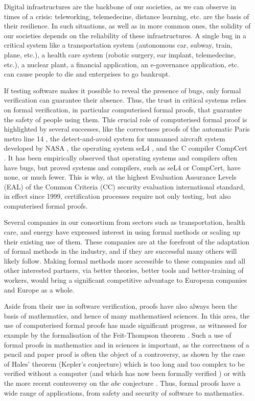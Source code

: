 \thispagestyle{empty}


Digital infrastructures are the backbone of our societies, as we can
observe in times of a crisis: teleworking, telemedecine, distance
learning, etc. are the basis of their resilience.  In such situations,
as well as in more common ones, the solidity of our societies depends
on the reliability of these infrastructures.  A single bug in a
critical system like a transportation system (autonomous car, subway,
train, plane, etc.), a health care system (robotic surgery, ear
implant, telemedecine, etc.), a nuclear plant, a financial
application, an e-governance application, etc.  can cause people to
die and enterprises to go bankrupt.

If testing software makes it possible to reveal the presence of bugs,
only formal verification can guarantee their absence. Thus, the trust
in critical systems relies on formal verification, in particular
computerised formal proofs, that guarantee the safety of people using
them. This crucial role of computerised formal proof is highlighted by
several successes, like the correctness proofs of the automatic Paris
metro line 14 \cite{Behm98,Lecomte17}, the detect-and-avoid system for
unmanned aircraft system developed by NASA \cite{Munoz16}, the
operating system seL4 \cite{Klein09}, and the C compiler CompCert
\cite{Leroy06}.  It has been empirically observed that operating
systems and compilers often have bugs, but proved systems and
compilers, such as seL4 or CompCert, have none, or much fewer.  This
is why, at the highest Evaluation Assurance Levels (EAL) of the Common
Criteria (CC) security evaluation international standard, in effect
since 1999, certification processes require not only testing, but also
computerised formal proofs.

Several companies in our consortium from sectors such as
transportation, health care, and energy have expressed interest in
using formal methods or scaling up their existing use of them. These
companies are at the forefront of the adaptation of formal methods in
the industry, and if they are successful many others will likely
follow. Making formal methods more accessible to these companies
and all other interested partners, via better theories, better tools
and better-training of workers, would bring a significant
competitive advantage to European companies and Europe as a whole.

Aside from their use in software verification, proofs have also always
been the basis of mathematics, and hence of many mathematised
sciences. In this area, the use of computerised formal proofs has made
significant progress, as witnessed for example by the formalisation of the
Feit-Thompson theorem \cite{Gonthier13}.  Such a use of formal proofs
in mathematics and in sciences is important, as the correctness of a
pencil and paper proof is often the object of a controversy, as shown
by the case of Hales' theorem (Kepler's conjecture) which is too long
and too complex to be verified without a computer (and which has now
been formally verified \cite{Hales17}) or with the more recent
controversy on the $abc$ conjecture \cite{Castelvecchi}. Thus, formal
proofs have a wide range of applications, from safety and security of
software to mathematics.

